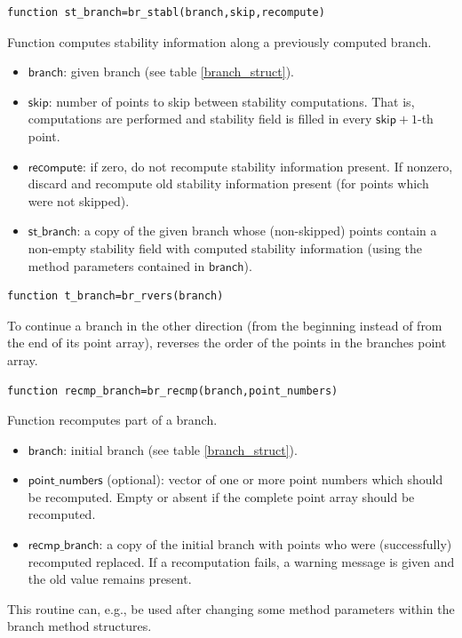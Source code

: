 \documentclass[10pt]{article}
\gdef \file#1{{\bfseries{\ttfamily{#1}}}}
\gdef \parm#1{{\mathsf{#1}}}
\begin{document}
{{\small\begin{verbatim}
function st_branch=br_stabl(branch,skip,recompute)
\end{verbatim}}
\noindent Function \file{br\_stabl} computes stability information
along a previously computed branch. 
\begin{itemize}
\item $\parm{branch}$: given branch (see table \ref{branch_struct}).
\item $\parm{skip}$: number of points to skip between stability computations.
That is, 
computations are
performed and stability field is filled in every $\parm{skip}+1$-th point.
\item $\parm{recompute}$: if zero, do not recompute stability information
present. If nonzero, discard and recompute old stability
information present (for points which were not skipped).
\item $\parm{st\_branch}$: a copy of the given branch whose (non-skipped) points 
contain a non-empty stability field with computed stability information
(using the method parameters contained in $\parm{branch}$).
\end{itemize}

{\small\begin{verbatim}
function t_branch=br_rvers(branch)
\end{verbatim}}
\noindent To continue a branch in the other direction (from the beginning instead
of from the end of its point array), \file{br\_rvers} reverses the
order of the points in the branches point array.

{\small\begin{verbatim}
function recmp_branch=br_recmp(branch,point_numbers)
\end{verbatim}}
\noindent Function \file{br\_recmp} recomputes part of a branch.
\begin{itemize}
\item $\parm{branch}$: initial branch (see table \ref{branch_struct}).
\item $\parm{point\_numbers}$ (optional): 
vector of one or more point numbers which should be
recomputed. Empty or absent if the complete point array should be recomputed.
\item $\parm{recmp\_branch}$: a copy of the initial branch with
points who were (successfully) recomputed replaced. If a recomputation fails, a
warning message is given and the old value remains present.
\end{itemize}
This routine can, e.g., be used after changing some method parameters within the branch
method structures.

}
\end{document}
